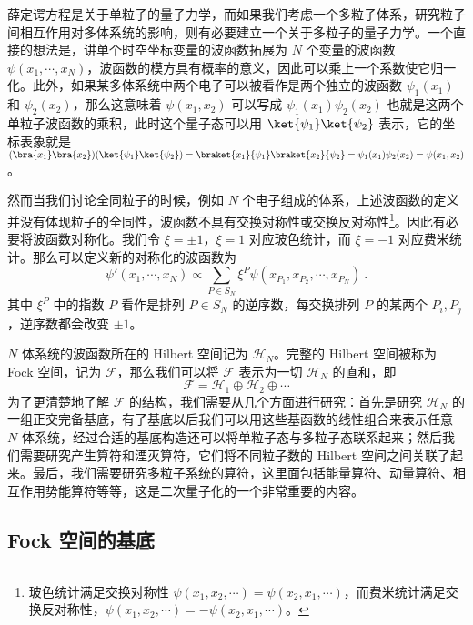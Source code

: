 

薛定谔方程是关于单粒子的量子力学，而如果我们考虑一个多粒子体系，研究粒子间相互作用对多体系统的影响，则有必要建立一个关于多粒子的量子力学。一个直接的想法是，讲单个时空坐标变量的波函数拓展为 $N$ 个变量的波函数 $\psi(x_1,\cdots,x_N)$，波函数的模方具有概率的意义，因此可以乘上一个系数使它归一化。此外，如果某多体系统中两个电子可以被看作是两个独立的波函数 $\psi_1(x_1)$ 和 $\psi_2(x_2)$，那么这意味着 $\psi(x_1,x_2)$ 可以写成 $\psi_1(x_1)\psi_2(x_2)$ 也就是这两个单粒子波函数的乘积，此时这个量子态可以用 $\ket{\psi_1}\ket{\psi_2}$ 表示，它的坐标表象就是 $(\bra{x_1}\bra{x_2})(\ket{\psi_1}\ket{\psi_2})=\braket{x_1}{\psi_1} \braket{x_2}{\psi_2}=\psi_1(x_1)\psi_2(x_2)=\psi(x_1,x_2)$。

然而当我们讨论全同粒子的时候，例如 $N$ 个电子组成的体系，上述波函数的定义并没有体现粒子的全同性，波函数不具有交换对称性或交换反对称性\footnote{玻色统计满足交换对称性 $\psi(x_1,x_2,\cdots)=\psi(x_2,x_1,\cdots)$，而费米统计满足交换反对称性，$\psi(x_1,x_2,\cdots)=-\psi(x_2,x_1,\cdots)$。}。因此有必要将波函数对称化。我们令 $\xi=\pm 1$，$\xi=1$ 对应玻色统计，而 $\xi=-1$ 对应费米统计。那么可以定义新的对称化的波函数为
\begin{equation}
\psi'(x_1,\cdots,x_N)\propto \sum_{P\in S_N} \xi^P \psi(x_{P_1},x_{P_2},\cdots,x_{P_N})~.
\end{equation}
其中 $\xi^P$ 中的指数 $P$ 看作是排列 $P\in S_N$ 的逆序数，每交换排列 $P$ 的某两个 $P_i,P_j$，逆序数都会改变 $\pm 1$。

$N$ 体系统的波函数所在的 Hilbert 空间记为 $\mathcal{H}_N$。完整的 Hilbert 空间被称为 Fock 空间，记为 $\mathcal{F}$，那么我们可以将 $\mathcal{F}$ 表示为一切 $\mathcal{H}_N$ 的直和，即
\begin{equation}\label{eq_SecQua_6}
\mathcal{F}=\mathcal{H}_1 \oplus \mathcal{H}_2 \oplus \cdots
\end{equation}
为了更清楚地了解 $\mathcal{F}$ 的结构，我们需要从几个方面进行研究：首先是研究 $\mathcal{H}_N$ 的一组正交完备基底，有了基底以后我们可以用这些基函数的线性组合来表示任意 $N$ 体系统，经过合适的基底构造还可以将单粒子态与多粒子态联系起来；然后我们需要研究产生算符和湮灭算符，它们将不同粒子数的 Hilbert 空间之间关联了起来。最后，我们需要研究多粒子系统的算符，这里面包括能量算符、动量算符、相互作用势能算符等等，这是二次量子化的一个非常重要的内容。
\subsection{Fock 空间的基底}
